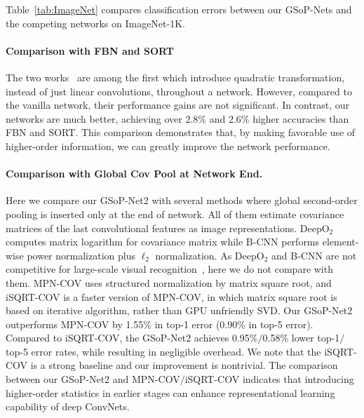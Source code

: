 \documentclass[10pt,twocolumn,letterpaper]{article}
\begin{document}
Table~\ref{tab:ImageNet} compares  classification errors between our GSoP-Nets and the competing networks  on ImageNet-1K. 

\vspace{-6pt}\paragraph{Comparison with FBN and SORT} The two works~\cite{LiYanghao_2017_ICCV,Wang_2017_ICCV} are among the first which introduce quadratic transformation, instead of just linear convolutions,   throughout a network. However, compared to the vanilla network, their performance gains are not significant. In contrast, our networks are much better, achieving over 2.8\% and 2.6\% higher accuracies than FBN and SORT. This comparison demonstrates that,  by making favorable use of higher-order information, we can greatly improve the network performance. 

\vspace{-6pt}\paragraph{Comparison with Global Cov Pool at Network End.} Here we compare our GSoP-Net2 with several methods where global second-order pooling is inserted only at the end of network. All of them estimate covariance matrices of the last convolutional features as image representations.  DeepO$_2$  computes matrix logarithm for covariance matrix while B-CNN performs element-wise power normalization plus $\ell_2$ normalization. As  DeepO$_2$ and B-CNN are not competitive for large-scale visual recognition~\cite{Li_2017_ICCV}, here we do not compare with them. MPN-COV uses structured normalization by matrix square root, and iSQRT-COV is a faster version of MPN-COV, in which matrix square root is based on iterative algorithm, rather than GPU unfriendly SVD. 
Our GSoP-Net2 outperforms MPN-COV by 1.55\% in top-1 error (0.90\% in top-5 error). Compared to iSQRT-COV, the GSoP-Net2 achieves 0.95\%$/$0.58\% lower  top-1$/$top-5 error rates, while resulting in negligible  overhead. We note that the iSQRT-COV is a strong baseline and our improvement is nontrivial. The comparison between our GSoP-Net2 and MPN-COV$/$iSQRT-COV indicates that introducing higher-order statistics in earlier stages can enhance representational  learning capability of deep ConvNets. 
\end{document}
